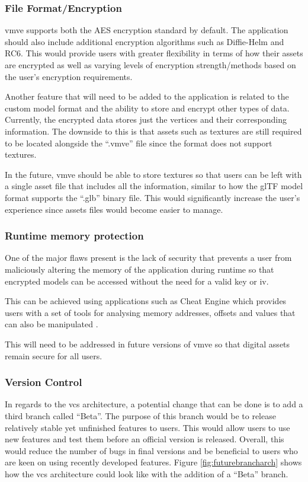 \documentclass[11pt]{article}
\begin{document}
\subsubsection{File Format/Encryption}
\gls*{vmve} supports both the AES encryption standard by default. The application
should also include additional encryption algorithms such as Diffie-Helm and
RC6. This would provide users with greater flexibility in terms of how their
assets are encrypted as well as varying levels of encryption strength/methods
based on the user's encryption requirements.

Another feature that will need to be added to the application is related to the
custom model format and the ability to store and encrypt other types of data.
Currently, the encrypted data stores just the vertices and their corresponding
information. The downside to this is that assets such as textures are still
required to be located alongside the ``.vmve'' file since the format does not
support textures.

In the future, \gls*{vmve} should be able to store textures so that users can be
left with a single asset file that includes all the information, similar to how
the glTF model format supports the ``.glb'' binary file. This would
significantly increase the user's experience since assets files would become
easier to manage.

\subsubsection{Runtime memory protection}
One of the major flaws present is the lack of security that prevents a user from
maliciously altering the memory of the application during runtime so that
encrypted models can be accessed without the need for a valid key or iv.

This can be achieved using applications such as Cheat Engine which provides
users with a set of tools for analysing memory addresses, offsets and values
that can also be manipulated \cite{cheat_engine}.

This will need to be addressed in future versions of \gls*{vmve} so that digital
assets remain secure for all users.

\subsubsection{Version Control}
In regards to the \gls*{vcs} architecture, a potential change that can be done is
to add a third branch called ``Beta''. The purpose of this branch would be to
release relatively stable yet unfinished features to users. This would allow
users to use new features and test them before an official version is released.
Overall, this would reduce the number of bugs in final versions and be
beneficial to users who are keen on using recently developed features. Figure
\ref{fig:futurebrancharch} shows how the \gls*{vcs} architecture could look like
with the addition of a ``Beta'' branch.
\end{document}
